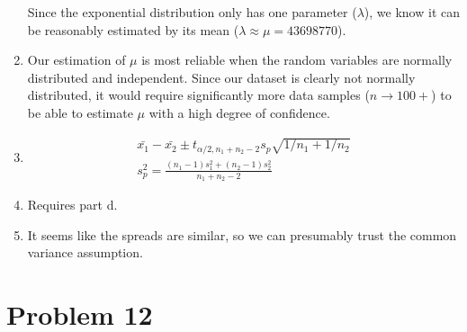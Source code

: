 \documentclass{article}
\begin{document}
\begin{enumerate}[label=(\alph*)]
          Since the exponential distribution only has one parameter (\(\lambda\)), we know it can be reasonably estimated by its mean (\(\lambda \approx \mu = 43698770\)).
    \item Our estimation of \(\mu\) is most reliable when the random variables are normally distributed and independent. Since our dataset is clearly not normally distributed, it would require significantly more data samples (\(n \rightarrow 100+\)) to be able to estimate \(\mu\) with a high degree of confidence.
    \item \begin{align*}
              \bar{x_1} - \bar{x_2} \pm t_{\alpha/2,n_1+n_2-2} s_p \sqrt{1/n_1 + 1/n_2} \\
              s_p^2 = \frac{(n_1-1)s_1^2+(n_2-1)s_2^2}{n_1+n_2-2}
          \end{align*}
    \item Requires part d. %
    \item It seems like the spreads are similar, so we can presumably trust the common variance assumption.
\end{enumerate}

\pagebreak
\section*{Problem 12}
\pagebreak
\end{document}
